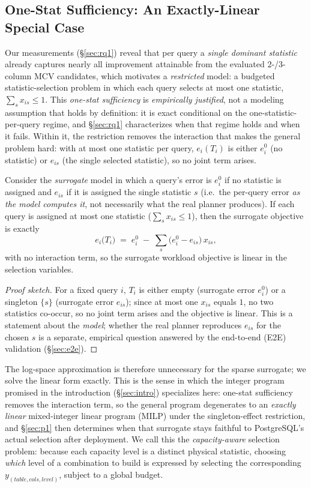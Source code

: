 \documentclass[sigconf, nonacm]{acmart}
\begin{document}
\subsection{One-Stat Sufficiency: An Exactly-Linear Special Case}
\label{sec:sparse}

Our measurements (\S\ref{sec:rq1}) reveal that per query a
\emph{single dominant statistic} already captures nearly all improvement
attainable from the evaluated 2-/3-column MCV candidates, which motivates a
\emph{restricted} model: a budgeted statistic-selection problem in which each
query selects at most one statistic, $\sum_s x_{is}\le 1$. This \emph{one-stat
sufficiency} is \emph{empirically justified}, not a modeling assumption that
holds by definition: it is exact conditional on the one-statistic-per-query
regime, and \S\ref{sec:rq1} characterizes when that regime holds and when it
fails. Within it, the restriction removes the interaction that makes the general
problem hard: with at most one statistic per query, $e_i(T_i)$ is either $e_i^0$
(no statistic) or $e_{is}$ (the single selected statistic), so no joint term
arises.

\begin{proposition}
\label{prop:linear}
Consider the \emph{surrogate} model in which a query's error is $e_i^0$ if no
statistic is assigned and $e_{is}$ if it is assigned the single statistic $s$
(i.e.\ the per-query error \emph{as the model computes it}, not necessarily what
the real planner produces). If each query is assigned at most one statistic
($\sum_s x_{is} \le 1$), then the surrogate objective is exactly
\[
  e_i\big(T_i\big)\;=\;e_i^0\;-\;\sum_s \big(e_i^0-e_{is}\big)\,x_{is},
\]
with no interaction term, so the surrogate workload objective is linear in the
selection variables.
\end{proposition}
\begin{proof}[Proof sketch]
For a fixed query $i$, $T_i$ is either empty (surrogate error $e_i^0$) or a
singleton $\{s\}$ (surrogate error $e_{is}$); since at most one $x_{is}$
equals $1$, no two statistics co-occur, so no joint term arises and the
objective is linear. This is a statement about the \emph{model}; whether the
real planner reproduces $e_{is}$ for the chosen $s$ is a separate, empirical
question answered by the end-to-end (E2E) validation (\S\ref{sec:e2e}).
\end{proof}

The log-space approximation is therefore unnecessary for the sparse surrogate;
we solve the linear form exactly. This is the sense in which the integer program
promised in the introduction (\S\ref{sec:intro}) specializes here: one-stat
sufficiency removes the interaction term, so the general program degenerates to
an \emph{exactly linear} mixed-integer linear program (MILP) under the
singleton-effect restriction, and
\S\ref{sec:p1} then determines when that surrogate stays faithful to
PostgreSQL's actual selection after deployment. We call this the \emph{capacity-aware} selection problem: because
each capacity level is a distinct physical statistic, choosing \emph{which}
level of a combination to build is expressed by selecting the corresponding
$y_{(table,cols,level)}$, subject to a global budget.
\end{document}
